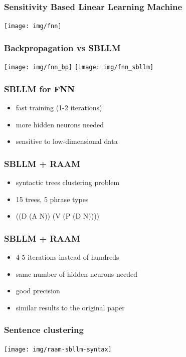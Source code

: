 \documentclass{beamer}
\begin{document}
\begin{frame}
\frametitle{Sensitivity Based Linear Learning Machine}
\begin{center}
	\texttt{[image: img/fnn]}
\end{center}
\end{frame}

\begin{frame}
\frametitle{Backpropagation vs SBLLM}
\begin{center}
	\texttt{[image: img/fnn\_bp]}
	\vspace{1.5cm}
	\texttt{[image: img/fnn\_sbllm]}
\end{center}
\end{frame}

\begin{frame}
\frametitle{SBLLM for FNN}
\begin{itemize}
	\item fast training (1-2 iterations)
	\item more hidden neurons needed
	\item sensitive to low-dimensional data
\end{itemize}
\end{frame}

\begin{frame}
\frametitle{SBLLM + RAAM}
\begin{itemize}
	\item syntactic trees clustering problem
	\item 15 trees, 5 phrase types
	\item ((D (A N)) (V (P (D N))))
\end{itemize}
\end{frame}

\begin{frame}
\frametitle{SBLLM + RAAM}
\begin{itemize}
	\item 4-5 iterations instead of hundreds
	\item same number of hidden neurons needed
	\item good precision
	\item similar results to the original paper
\end{itemize}
\end{frame}

\begin{frame}
\frametitle{Sentence clustering}
\begin{center}
	\texttt{[image: img/raam-sbllm-syntax]}
\end{center}
\end{frame}
\end{document}
